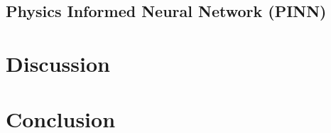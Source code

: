 \documentclass[11pt, titlepage]{article}
\begin{document}
    \subsection{Physics Informed Neural Network (PINN)}

    

\section{Discussion}
\section{Conclusion}








\end{document}
